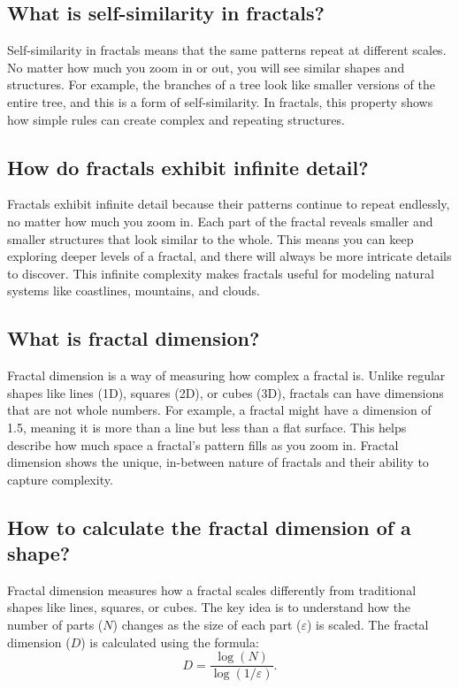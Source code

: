 \documentclass[12pt]{article}
\begin{document}
\subsection{What is self-similarity in fractals?}
Self-similarity in fractals means that the same patterns repeat at different scales. No matter how much you zoom in or out, you will see similar shapes and structures. For example, the branches of a tree look like smaller versions of the entire tree, and this is a form of self-similarity. In fractals, this property shows how simple rules can create complex and repeating structures.

\subsection{How do fractals exhibit infinite detail?}
Fractals exhibit infinite detail because their patterns continue to repeat endlessly, no matter how much you zoom in. Each part of the fractal reveals smaller and smaller structures that look similar to the whole. This means you can keep exploring deeper levels of a fractal, and there will always be more intricate details to discover. This infinite complexity makes fractals useful for modeling natural systems like coastlines, mountains, and clouds.

\subsection{What is fractal dimension?}
Fractal dimension is a way of measuring how complex a fractal is. Unlike regular shapes like lines (1D), squares (2D), or cubes (3D), fractals can have dimensions that are not whole numbers. For example, a fractal might have a dimension of 1.5, meaning it is more than a line but less than a flat surface. This helps describe how much space a fractal's pattern fills as you zoom in. Fractal dimension shows the unique, in-between nature of fractals and their ability to capture complexity.

\subsection{How to calculate the fractal dimension of a shape?}
Fractal dimension measures how a fractal scales differently from traditional shapes like lines, squares, or cubes. The key idea is to understand how the number of parts (\(N\)) changes as the size of each part (\(\varepsilon\)) is scaled. The fractal dimension (\(D\)) is calculated using the formula:
\[
D = \frac{\log(N)}{\log(1/\varepsilon)}.
\]
\end{document}
